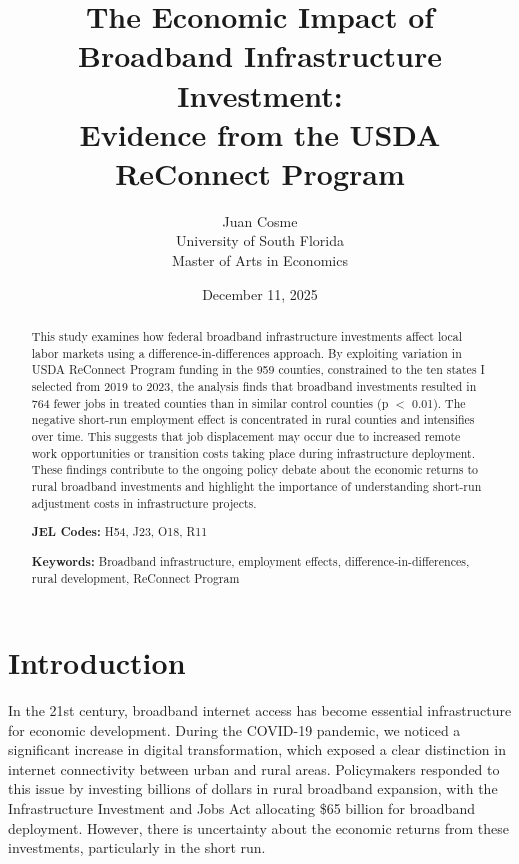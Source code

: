 \documentclass[12pt]{article}
\title{\textbf{The Economic Impact of Broadband Infrastructure Investment:\\ Evidence from the USDA ReConnect Program}}
\author{
    Juan Cosme\\
    University of South Florida\\
    Master of Arts in Economics\\
}
\date{December 11, 2025}
\begin{document}
\maketitle

\begin{abstract}
\noindent This study examines how federal broadband infrastructure investments affect local labor markets using a difference-in-differences approach. By exploiting variation in USDA ReConnect Program funding in the 959 counties, constrained to the ten states I selected from 2019 to 2023, the analysis finds that broadband investments resulted in 764 fewer jobs in treated counties than in similar control counties (p $<$ 0.01). The negative short-run employment effect is concentrated in rural counties and intensifies over time. This suggests that job displacement may occur due to increased remote work opportunities or transition costs taking place during infrastructure deployment. These findings contribute to the ongoing policy debate
about the economic returns to rural broadband investments and highlight the importance of understanding short-run adjustment costs in infrastructure projects.

\vspace{0.2in}

\noindent \textbf{JEL Codes:} H54, J23, O18, R11

\noindent \textbf{Keywords:} Broadband infrastructure, employment effects, difference-in-differences, rural development, ReConnect Program
\end{abstract}

\newpage

\tableofcontents

\newpage

\section{Introduction}

In the 21st century, broadband internet access has become essential infrastructure for economic development. During the COVID-19 pandemic, we noticed a significant increase in digital transformation, which exposed a clear distinction in internet connectivity between urban and rural areas. Policymakers responded to this issue by investing billions of dollars in rural broadband expansion, with the Infrastructure Investment and Jobs Act allocating \$65 billion for broadband deployment. However, there is uncertainty about the economic returns from these investments, particularly in the short run.
\end{document}
